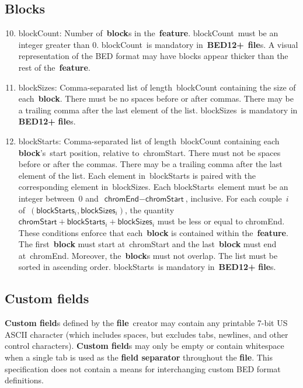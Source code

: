 \documentclass[11pt]{article}
\begin{document}
\subsection{Blocks}
\begin{enumerate}
  \setcounter{enumi}{9}

\item \textsf{blockCount}: Number of~\textbf{block}s in the~\textbf{feature}.
  \textsf{blockCount}~must be an integer greater than 0.
  \textsf{blockCount}~is mandatory in~\textbf{BED12+}~\textbf{file}s.
  A visual representation of the \ac{BED} format may have blocks appear thicker than the rest of the~\textbf{feature}.

\item \textsf{blockSizes}: Comma-separated list of length~\textsf{blockCount} containing the size of each~\textbf{block}.
  There must be no spaces before or after commas.
  There may be a trailing comma after the last element of the list.
  \textsf{blockSizes}~is mandatory in \textbf{BED12+} \textbf{file}s.

\item \textsf{blockStarts}: Comma-separated list of length~\textsf{blockCount} containing each \textbf{block}'s~start position, relative to~\textsf{chromStart}.
  There must not be spaces before or after the commas.
  There may be a trailing comma after the last element of the list.
  Each element in~\textsf{blockStarts} is paired with the corresponding element in~\textsf{blockSizes}.
  Each \textsf{blockStarts}~element must be an integer between~0 and~$\textsf{chromEnd} - \textsf{chromStart}$, inclusive.
  For each couple~$i$ of~$(\textsf{blockStarts}_i, \textsf{blockSizes}_i)$, the quantity~$\textsf{chromStart} + \textsf{blockStarts}_i + \textsf{blockSizes}_i$ must be less or equal to \textsf{chromEnd}.
  These conditions enforce that each~\textbf{block} is contained within the~\textbf{feature}.
  The first~\textbf{block} must start at~\textsf{chromStart} and the last~\textbf{block} must end at~\textsf{chromEnd}.
  Moreover, the~\textbf{block}s must not overlap.
  The list must be sorted in ascending order.
  \textsf{blockStarts}~is mandatory in~\textbf{BED12+} \textbf{file}s.
\end{enumerate}

\subsection{Custom fields}

\textbf{Custom field}s defined by the \textbf{file}~creator may contain any printable 7-bit US \ac{ASCII} character (which includes spaces, but excludes tabs, newlines, and other control characters).
\textbf{Custom field}s may only be empty or contain whitespace when a single tab is used as the \textbf{field separator} throughout the \textbf{file}.
This specification does not contain a means for interchanging custom \ac{BED} format definitions.
\end{document}
